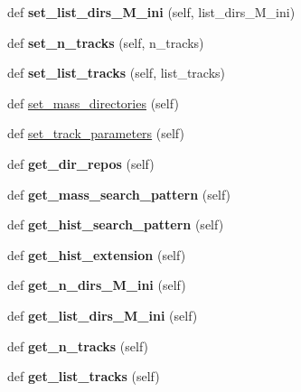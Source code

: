 \begin{DoxyCompactItemize}
def {\bfseries set\+\_\+list\+\_\+dirs\+\_\+\+M\+\_\+ini} (self, list\+\_\+dirs\+\_\+\+M\+\_\+ini)
\item 
\mbox{\label{classasamba_1_1var__def_1_1tracks_a148ce756693d708911775b3c2820c1f0}} 
def {\bfseries set\+\_\+n\+\_\+tracks} (self, n\+\_\+tracks)
\item 
\mbox{\label{classasamba_1_1var__def_1_1tracks_ad8905211d69ef4b3199cedc83bc94803}} 
def {\bfseries set\+\_\+list\+\_\+tracks} (self, list\+\_\+tracks)
\item 
def \hyperlink{classasamba_1_1var__def_1_1tracks_abd062bf94f2cd69eab54d2a081bebad1}{set\+\_\+mass\+\_\+directories} (self)
\item 
def \hyperlink{classasamba_1_1var__def_1_1tracks_a743c0e7e4af42a5c67f8a4be54a7d3c6}{set\+\_\+track\+\_\+parameters} (self)
\item 
\mbox{\label{classasamba_1_1var__def_1_1tracks_a8a24194336cd06e10cd0e4431cff963f}} 
def {\bfseries get\+\_\+dir\+\_\+repos} (self)
\item 
\mbox{\label{classasamba_1_1var__def_1_1tracks_ae2293a407b4f731e3f76de188de57ec5}} 
def {\bfseries get\+\_\+mass\+\_\+search\+\_\+pattern} (self)
\item 
\mbox{\label{classasamba_1_1var__def_1_1tracks_aeb2f2c3e19db68028deb8bcd65eee114}} 
def {\bfseries get\+\_\+hist\+\_\+search\+\_\+pattern} (self)
\item 
\mbox{\label{classasamba_1_1var__def_1_1tracks_aac18c3f27f1fe9d5fc9005461f57d000}} 
def {\bfseries get\+\_\+hist\+\_\+extension} (self)
\item 
\mbox{\label{classasamba_1_1var__def_1_1tracks_afab2403696c70d59afc162276a793783}} 
def {\bfseries get\+\_\+n\+\_\+dirs\+\_\+\+M\+\_\+ini} (self)
\item 
\mbox{\label{classasamba_1_1var__def_1_1tracks_a25425bb3a9c187e4fb4cfcfc45f794f9}} 
def {\bfseries get\+\_\+list\+\_\+dirs\+\_\+\+M\+\_\+ini} (self)
\item 
\mbox{\label{classasamba_1_1var__def_1_1tracks_a180bebc4deeb360ba14d70010103ab9a}} 
def {\bfseries get\+\_\+n\+\_\+tracks} (self)
\item 
\mbox{\label{classasamba_1_1var__def_1_1tracks_ae8321984c301c8df018c02385c7ceb40}} 
def {\bfseries get\+\_\+list\+\_\+tracks} (self)
\end{DoxyCompactItemize}
